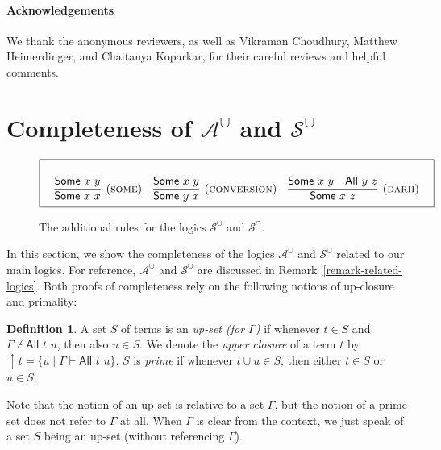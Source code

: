 \documentclass[letterpaper]{article} %
\theoremstyle{definition}
\newtheorem{definition}[theorem]{Definition}
\newcommand{\set}[1]{\{ #1 \}}
\newcommand{\proves}{\vdash}
\newcommand{\Aunion}{\mathscr{A}^{\cup}}
\newcommand{\Sunion}{\mathscr{S}^{\cup}}
\newcommand{\Sinter}{\mathscr{S}^{\cap}}
\newcommand{\proverule}{\textsc}
\newcommand{\some}{\proverule{some}}
\newcommand{\conversion}{\proverule{conversion}}
\newcommand{\darii}{\proverule{darii}}
\newcommand{\All}[2]{\mathsf{All}\,\,#1\,\,#2}
\newcommand{\Some}[2]{\mathsf{Some}\,\,#1\,\,#2}
\begin{document}
\paragraph{Acknowledgements} We thank the anonymous reviewers, as well as Vikraman Choudhury, Matthew Heimerdinger, and Chaitanya Koparkar, for their careful reviews and helpful comments.


\section{Completeness of $\Aunion$ and $\Sunion$}
\label{s:supp:completeness_Aunion_Sunion}

\begin{figure*}[t]
\begin{equation*}
\boxed{
\begin{array}{c}
\begin{array}{ccc}
\\ 
\infer[(\some)]
    {\Some{x}{x}}
    {\Some{x}{y}} 
&
\infer[(\conversion)]
    {\Some{y}{x}}
    {\Some{x}{y}}
&
\infer[(\darii)]
    {\Some{x}{z}}
    {\Some{x}{y} & \All{y}{z}}
\end{array}
\\
\end{array}
}
\end{equation*}
\caption{The additional rules for the logics $\Sunion$ and $\Sinter$.
\label{fig-rules-some}}
\end{figure*}

In this section, we show the completeness of the logics $\Aunion$ and $\Sunion$ related to our main logics.  For reference, $\Aunion$ and $\Sunion$ are discussed in Remark~\ref{remark-related-logics}.  Both proofs of completeness rely on the following notions of up-closure and primality:

\begin{definition} 
A set $S$ of terms is an \emph{up-set (for $\Gamma$)} if whenever $t\in S$ and $\Gamma \nvdash \All{t}{u}$, then also $u\in S$.  We denote the \emph{upper closure} of a term $t$ by $\uparrow t = \set{u \mid \Gamma \proves \All{t}{u}}$.
$S$ is \emph{prime} if whenever $t\cup u \in S$, then either $t\in S$ or $u\in S$.
\end{definition}

Note that the notion of an up-set is relative to a set $\Gamma$, but the notion of a prime set does not refer to $\Gamma$ at all.
When $\Gamma$ is clear from the context, we just speak of a set $S$ being an up-set (without referencing $\Gamma$).
\end{document}
